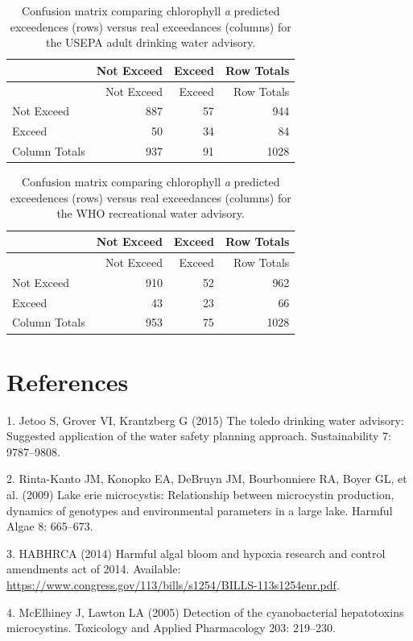\documentclass[10pt,a4paper,twocolumn]{article}
\begin{document}
\newpage

\begin{longtable}[c]{@{}lrrr@{}}
\caption{Confusion matrix comparing chlorophyll \textit{a} predicted
exceedences (rows) versus real exceedances (columns) for the USEPA adult
drinking water advisory. \label{tab:adult_conmat_table}}\tabularnewline
\toprule
& Not Exceed & Exceed & Row Totals\tabularnewline
\midrule
\endfirsthead
\toprule
& Not Exceed & Exceed & Row Totals\tabularnewline
\midrule
\endhead
Not Exceed & 887 & 57 & 944\tabularnewline
Exceed & 50 & 34 & 84\tabularnewline
Column Totals & 937 & 91 & 1028\tabularnewline
\bottomrule
\end{longtable}

\newpage

\begin{longtable}[c]{@{}lrrr@{}}
\caption{Confusion matrix comparing chlorophyll \textit{a} predicted
exceedences (rows) versus real exceedances (columns) for the WHO
recreational water advisory.
\label{tab:who_rec_conmat_table}}\tabularnewline
\toprule
& Not Exceed & Exceed & Row Totals\tabularnewline
\midrule
\endfirsthead
\toprule
& Not Exceed & Exceed & Row Totals\tabularnewline
\midrule
\endhead
Not Exceed & 910 & 52 & 962\tabularnewline
Exceed & 43 & 23 & 66\tabularnewline
Column Totals & 953 & 75 & 1028\tabularnewline
\bottomrule
\end{longtable}

\newpage

\section*{References}\label{references}

1. Jetoo S, Grover VI, Krantzberg G (2015) The toledo drinking water
advisory: Suggested application of the water safety planning approach.
Sustainability 7: 9787--9808.

2. Rinta-Kanto JM, Konopko EA, DeBruyn JM, Bourbonniere RA, Boyer GL, et
al. (2009) Lake erie microcystis: Relationship between microcystin
production, dynamics of genotypes and environmental parameters in a
large lake. Harmful Algae 8: 665--673.

3. HABHRCA (2014) Harmful algal bloom and hypoxia research and control
amendments act of 2014. Available:
\url{https://www.congress.gov/113/bills/s1254/BILLS-113s1254enr.pdf}.

4. McElhiney J, Lawton LA (2005) Detection of the cyanobacterial
hepatotoxins microcystins. Toxicology and Applied Pharmacology 203:
219--230.
\end{document}
